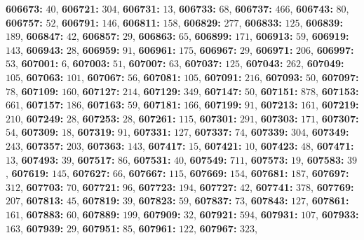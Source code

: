 \textsf{\bfseries 606673:} $40$, \textsf{\bfseries 606721:} $304$, \textsf{\bfseries 606731:} $13$, \textsf{\bfseries 606733:} $68$, \textsf{\bfseries 606737:} $466$, \textsf{\bfseries 606743:} $80$, \textsf{\bfseries 606757:} $52$, \textsf{\bfseries 606791:} $146$, \textsf{\bfseries 606811:} $158$, \textsf{\bfseries 606829:} $277$, \textsf{\bfseries 606833:} $125$, \textsf{\bfseries 606839:} $189$, \textsf{\bfseries 606847:} $42$, \textsf{\bfseries 606857:} $29$, \textsf{\bfseries 606863:} $65$, \textsf{\bfseries 606899:} $171$, \textsf{\bfseries 606913:} $59$, \textsf{\bfseries 606919:} $143$, \textsf{\bfseries 606943:} $28$, \textsf{\bfseries 606959:} $91$, \textsf{\bfseries 606961:} $175$, \textsf{\bfseries 606967:} $29$, \textsf{\bfseries 606971:} $206$, \textsf{\bfseries 606997:} $53$, \textsf{\bfseries 607001:} $6$, \textsf{\bfseries 607003:} $51$, \textsf{\bfseries 607007:} $63$, \textsf{\bfseries 607037:} $125$, \textsf{\bfseries 607043:} $262$, \textsf{\bfseries 607049:} $105$, \textsf{\bfseries 607063:} $101$, \textsf{\bfseries 607067:} $56$, \textsf{\bfseries 607081:} $105$, \textsf{\bfseries 607091:} $216$, \textsf{\bfseries 607093:} $50$, \textsf{\bfseries 607097:} $78$, \textsf{\bfseries 607109:} $160$, \textsf{\bfseries 607127:} $214$, \textsf{\bfseries 607129:} $349$, \textsf{\bfseries 607147:} $50$, \textsf{\bfseries 607151:} $878$, \textsf{\bfseries 607153:} $661$, \textsf{\bfseries 607157:} $186$, \textsf{\bfseries 607163:} $59$, \textsf{\bfseries 607181:} $166$, \textsf{\bfseries 607199:} $91$, \textsf{\bfseries 607213:} $161$, \textsf{\bfseries 607219:} $210$, \textsf{\bfseries 607249:} $28$, \textsf{\bfseries 607253:} $28$, \textsf{\bfseries 607261:} $115$, \textsf{\bfseries 607301:} $291$, \textsf{\bfseries 607303:} $171$, \textsf{\bfseries 607307:} $54$, \textsf{\bfseries 607309:} $18$, \textsf{\bfseries 607319:} $91$, \textsf{\bfseries 607331:} $127$, \textsf{\bfseries 607337:} $74$, \textsf{\bfseries 607339:} $304$, \textsf{\bfseries 607349:} $243$, \textsf{\bfseries 607357:} $203$, \textsf{\bfseries 607363:} $143$, \textsf{\bfseries 607417:} $15$, \textsf{\bfseries 607421:} $10$, \textsf{\bfseries 607423:} $48$, \textsf{\bfseries 607471:} $13$, \textsf{\bfseries 607493:} $39$, \textsf{\bfseries 607517:} $86$, \textsf{\bfseries 607531:} $40$, \textsf{\bfseries 607549:} $711$, \textsf{\bfseries 607573:} $19$, \textsf{\bfseries 607583:} $39$, \textsf{\bfseries 607619:} $145$, \textsf{\bfseries 607627:} $66$, \textsf{\bfseries 607667:} $115$, \textsf{\bfseries 607669:} $154$, \textsf{\bfseries 607681:} $187$, \textsf{\bfseries 607697:} $312$, \textsf{\bfseries 607703:} $70$, \textsf{\bfseries 607721:} $96$, \textsf{\bfseries 607723:} $194$, \textsf{\bfseries 607727:} $42$, \textsf{\bfseries 607741:} $378$, \textsf{\bfseries 607769:} $207$, \textsf{\bfseries 607813:} $45$, \textsf{\bfseries 607819:} $39$, \textsf{\bfseries 607823:} $59$, \textsf{\bfseries 607837:} $73$, \textsf{\bfseries 607843:} $127$, \textsf{\bfseries 607861:} $161$, \textsf{\bfseries 607883:} $60$, \textsf{\bfseries 607889:} $199$, \textsf{\bfseries 607909:} $32$, \textsf{\bfseries 607921:} $594$, \textsf{\bfseries 607931:} $107$, \textsf{\bfseries 607933:} $163$, \textsf{\bfseries 607939:} $29$, \textsf{\bfseries 607951:} $85$, \textsf{\bfseries 607961:} $122$, \textsf{\bfseries 607967:} $323$, 
